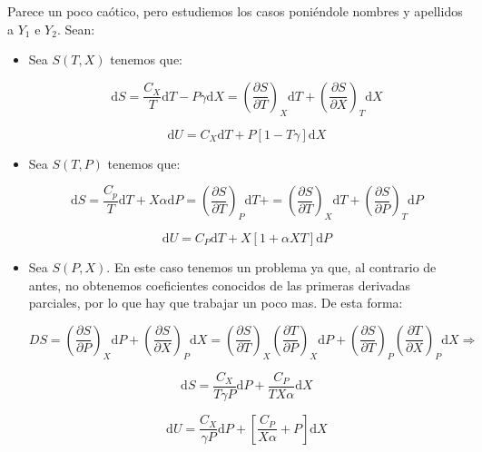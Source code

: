 \documentclass[12pt,a4paper]{article}
\newcommand{\D}{\mathrm{d}}
\newcommand{\parentesis}[1]{\left( #1 \right)}
\newcommand{\parciales}[2]{\frac{\partial #1}{\partial #2}}
\begin{document}
Parece un poco caótico, pero estudiemos los casos poniéndole nombres y apellidos a $Y_1$ e $Y_2$. Sean: 

\begin{itemize}

\item Sea $S(T,X)$ tenemos que:

\begin{equation}
\D S = \dfrac{C_X}{T} \D T - P \gamma \D X = \parentesis{\parciales{S}{T}}_{X} \D T + \parentesis{\parciales{S}{X}}_{T} \D X 
\end{equation}

\begin{equation}
\D U = C_X \D T + P[1- T \gamma] \D X
\end{equation}


\item Sea $S(T,P)$ tenemos que:

\begin{equation}
\D S = \dfrac{C_p}{T} \D T + X \alpha \D P = \parentesis{\parciales{S}{T}}_{P} \D T +  = \parentesis{\parciales{S}{T}}_{X} \D T + \parentesis{\parciales{S}{P}}_{T} \D P 
\end{equation}

\begin{equation}
\D U = C_P \D T + X[1 + \alpha X T] \D P 
\end{equation}

\item Sea $S(P,X)$. En este caso tenemos un problema ya que, al contrario de antes, no obtenemos coeficientes conocidos de las primeras derivadas parciales, por lo que hay que trabajar un poco mas. De esta forma: 

$$ D S = \parentesis{\parciales{S}{P}}_X \D P  + \parentesis{\parciales{S}{X}}_{P} \D X =  \parentesis{\parciales{S}{T}}_{X}  \parentesis{\parciales{T}{P}}_{X} \D P +  \parentesis{\parciales{S}{T}}_{P}  \parentesis{\parciales{T}{X}}_{P} \D X \Longrightarrow
$$

\begin{equation}
\D S = \dfrac{C_X}{T \gamma P} \D P + \dfrac{C_P}{T X \alpha} \D X 
\end{equation}

\begin{equation}
\D U = \dfrac{C_X}{\gamma P} \D P + \left[ \dfrac{C_P}{X \alpha} + P \right] \D X
\end{equation}

\end{itemize}
\end{document}
